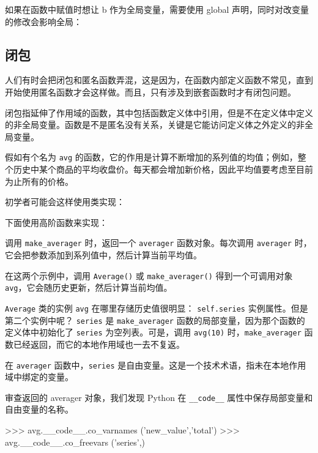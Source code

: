 如果在函数中赋值时想让 b 作为全局变量，需要使用 global 声明，同时对改变量的修改会影响全局：



\subsection{闭包}

人们有时会把闭包和匿名函数弄混，这是因为，在函数内部定义函数不常见，直到开始使用匿名函数才会这样做。而且，只有涉及到嵌套函数时才有闭包问题。

闭包指延伸了作用域的函数，其中包括函数定义体中引用，但是不在定义体中定义的非全局变量。函数是不是匿名没有关系，关键是它能访问定义体之外定义的非全局变量。

假如有个名为 \texttt{avg} 的函数，它的作用是计算不断增加的系列值的均值；例如，整个历史中某个商品的平均收盘价。每天都会增加新价格，因此平均值要考虑至目前为止所有的价格。

初学者可能会这样使用类实现：



下面使用高阶函数来实现：



调用 \texttt{make\_averager} 时，返回一个 \texttt{averager} 函数对象。每次调用 \texttt{averager} 时，它会把参数添加到系列值中，然后计算当前平均值。

在这两个示例中，调用 \texttt{Average()} 或 \texttt{make\_averager()} 得到一个可调用对象 \texttt{avg}，它会随历史更新，然后计算当前均值。

\texttt{Average} 类的实例 \texttt{avg} 在哪里存储历史值很明显： \texttt{self.series} 实例属性。但是第二个实例中呢？ \texttt{series} 是 \texttt{make\_averager} 函数的局部变量，因为那个函数的定义体中初始化了 \texttt{series} 为空列表。可是，调用 \texttt{avg(10)} 时，\texttt{make\_averager} 函数已经返回，而它的本地作用域也一去不复返。

在 \texttt{averager} 函数中，\texttt{series} 是自由变量。这是一个技术术语，指未在本地作用域中绑定的变量。

审查返回的 averager 对象，我们发现 Python 在 \texttt{\_\_code\_\_} 属性中保存局部变量和自由变量的名称。

\begin{python}
>>> avg.__code__.co_varnames
('new_value','total')
>>> avg.__code__.co_freevars
('series',)
\end{python}

